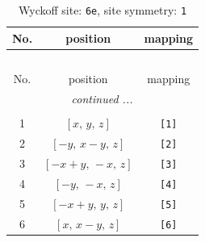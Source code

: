 \documentclass[fleqn,8pt]{jsarticle}
\begin{document}
\begin{longtable}{ccc}
\caption{Wyckoff site: {\tt 6e}, site symmetry: {\tt 1}}
 \\
 \hline \hline
No. & position & mapping \\ \hline \endfirsthead

\multicolumn{2}{l}{\tablename\ \thetable{}} \\
 \hline \hline
No. & position & mapping \\ \hline \endhead

 \hline \hline
\multicolumn{2}{r}{\footnotesize\it continued ...} \\ \endfoot

 \hline \hline
\multicolumn{2}{r}{} \\ \endlastfoot

1 & $\left[ x,\, y,\, z \right]$ & {\tt [1]} \\ \hline
2 & $\left[ - y,\, x - y,\, z \right]$ & {\tt [2]} \\ \hline
3 & $\left[ - x + y,\, - x,\, z \right]$ & {\tt [3]} \\ \hline
4 & $\left[ - y,\, - x,\, z \right]$ & {\tt [4]} \\ \hline
5 & $\left[ - x + y,\, y,\, z \right]$ & {\tt [5]} \\ \hline
6 & $\left[ x,\, x - y,\, z \right]$ & {\tt [6]} \\
\end{longtable}
\end{document}
